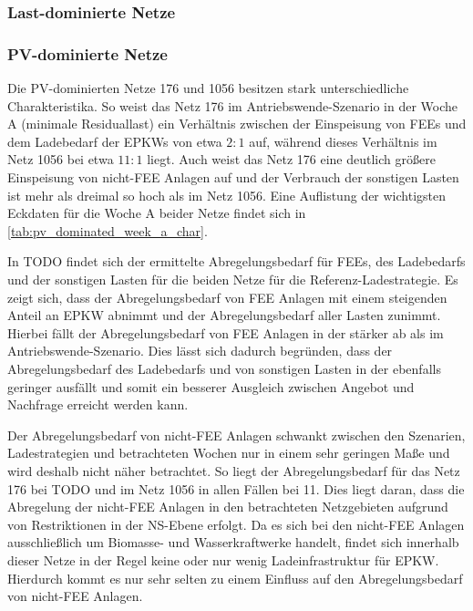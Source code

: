 \subsubsection{Last-dominierte Netze}




\subsubsection{PV-dominierte Netze}

Die \gls{PV}-dominierten Netze \num{176} und \num{1056} besitzen stark unterschiedliche Charakteristika.
So weist das Netz \num{176} im Antriebswende-Szenario in der Woche A (minimale Residuallast) ein Verhältnis zwischen der Einspeisung von \glspl{FEE} und dem Ladebedarf der \glspl{EPKW} von etwa \(2:1\) auf, während dieses Verhältnis im Netz \num{1056} bei etwa \(11:1\) liegt.
Auch weist das Netz \num{176} eine deutlich größere Einspeisung von nicht-\gls{FEE} Anlagen auf und der Verbrauch der sonstigen Lasten ist mehr als dreimal so hoch als im Netz \num{1056}.
Eine Auflistung der wichtigsten Eckdaten für die Woche A beider Netze findet sich in \autoref{tab:pv_dominated_week_a_char}.



In {\color{red} TODO} findet sich der ermittelte Abregelungsbedarf für \glspl{FEE}, des Ladebedarfs und der sonstigen Lasten für die beiden Netze für die Referenz-Ladestrategie.
Es zeigt sich, dass der Abregelungsbedarf von \gls{FEE} Anlagen mit einem steigenden Anteil an \gls{EPKW} abnimmt und der Abregelungsbedarf aller Lasten zunimmt.
Hierbei fällt der Abregelungsbedarf von \gls{FEE} Anlagen in der \SzeFirmenparkplatz stärker ab als im Antriebswende-Szenario.
Dies lässt sich dadurch begründen, dass der Abregelungsbedarf des Ladebedarfs und von sonstigen Lasten in der \SzeFirmenparkplatz ebenfalls geringer ausfällt und somit ein besserer Ausgleich zwischen Angebot und Nachfrage erreicht werden kann.



Der Abregelungsbedarf von nicht-\gls{FEE} Anlagen schwankt zwischen den Szenarien, Ladestrategien und betrachteten Wochen nur in einem sehr geringen Maße und wird deshalb nicht näher betrachtet.
So liegt der Abregelungsbedarf für das Netz \num{176} bei {\color{red} TODO} und im Netz \num{1056} in allen Fällen bei \SI{11}{\mwh}.
Dies liegt daran, dass die Abregelung der nicht-\gls{FEE} Anlagen in den betrachteten Netzgebieten aufgrund von Restriktionen in der \gls{NS}-Ebene erfolgt.
Da es sich bei den nicht-\gls{FEE} Anlagen ausschließlich um Biomasse- und Wasserkraftwerke handelt, findet sich innerhalb dieser Netze in der Regel keine oder nur wenig Ladeinfrastruktur für \gls{EPKW}.
Hierdurch kommt es nur sehr selten zu einem Einfluss auf den Abregelungsbedarf von nicht-\gls{FEE} Anlagen.

